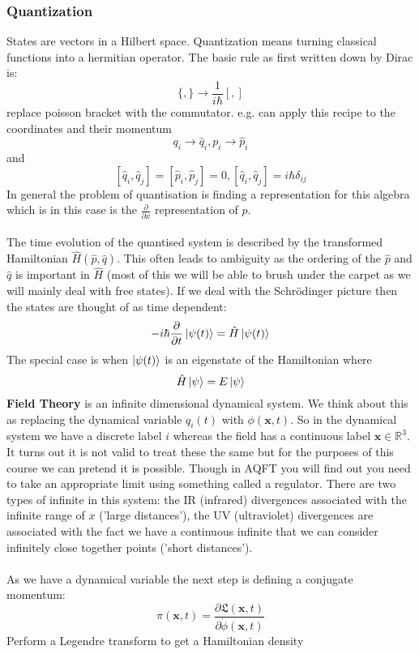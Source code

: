 \documentclass[12pt, a4paper, twoside, titlepage]{article}
\begin{document}
\subsubsection{Quantization}
States are vectors in a Hilbert space. Quantization means turning classical functions into a hermitian operator. The basic rule as first written down by Dirac is:
$$
\{,\} \rightarrow \frac{1}{i\hbar}[,]
$$
replace poisson bracket with the commutator. e.g. can apply this recipe to the coordinates and their momentum
$$
q_i \rightarrow \hat q_i, p_i \rightarrow \hat p_i
$$
and 
$$
[\hat q_i, \hat q_j] = [\hat p_i, \hat p_j] = 0, [\hat q_i, \hat q_j] = i\hbar \delta_{ij}
$$
In general the problem of quantisation is finding a representation for this algebra which is in this case is the $\frac{\partial}{\partial x}$ representation of $p$.\\\\
The time evolution of the quantised system is described by the transformed Hamiltonian $\hat H( \hat p, \hat q)$. This often leads to ambiguity as the ordering of the $\hat p$ and $\hat q$ is important in $\hat H$ (most of this we will be able to brush under the carpet as we will mainly deal with free states). If we deal with the Schrödinger picture then the states are thought of as time dependent:
$$
-i\hbar \frac{\partial }{\partial t} \ket{\psi(t)} = \hat H \ket{\psi(t)}
$$
The special case is when $\ket{\psi(t)}$ is an eigenstate of the Hamiltonian where
$$
\hat H\ket{\psi} = E \ket{\psi}
$$
\textbf{Field Theory} is an infinite dimensional dynamical system. We think about this as replacing the dynamical variable $q_i(t)$ with $\phi(\bm x, t)$. So in the dynamical system we have a discrete label $i$ whereas the field has a continuous label $\bm x \in \mathbb{R}^3$. It turns out it is not valid to treat these the same but for the purposes of this course we can pretend it is possible. Though in AQFT you will find out you need to take an appropriate limit using something called a regulator. There are two types of infinite in this system: the IR (infrared) divergences associated with the infinite range of $x$ ('large distances'), the UV (ultraviolet) divergences are associated with the fact we have a continuous infinite that we can consider infinitely close together points ('short distances').\\\\
As we have a dynamical variable the next step is defining a conjugate momentum:
$$
\pi(\bm x,t) = \frac{\partial \mathfrak{L}(\bm x, t)}{\partial \dot \phi(\bm x, t)}
$$
Perform a Legendre transform to get a Hamiltonian density
\end{document}
